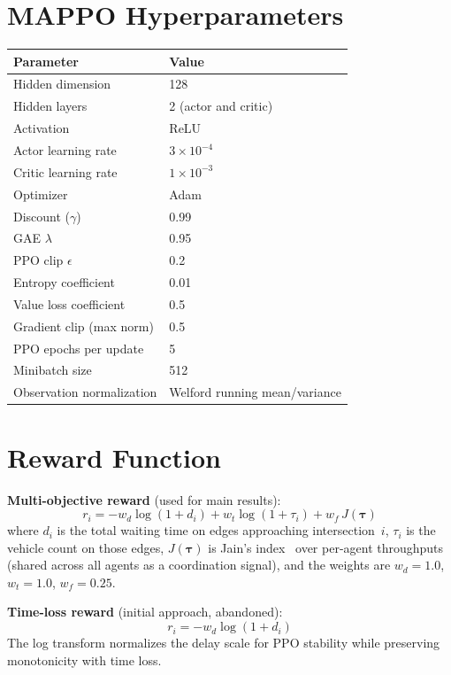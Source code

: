 \section{MAPPO Hyperparameters}
\label{app:hyperparams}

\begin{tabular}{@{}ll@{}}
\toprule
\textbf{Parameter} & \textbf{Value} \\
\midrule
Hidden dimension          & 128 \\
Hidden layers             & 2 (actor and critic) \\
Activation                & ReLU \\
Actor learning rate       & $3 \times 10^{-4}$ \\
Critic learning rate      & $1 \times 10^{-3}$ \\
Optimizer                 & Adam \\
Discount ($\gamma$)       & 0.99 \\
GAE $\lambda$             & 0.95 \\
PPO clip $\epsilon$       & 0.2 \\
Entropy coefficient       & 0.01 \\
Value loss coefficient    & 0.5 \\
Gradient clip (max norm)  & 0.5 \\
PPO epochs per update     & 5 \\
Minibatch size            & 512 \\
Observation normalization & Welford running mean/variance \\
\bottomrule
\end{tabular}

\section{Reward Function}
\label{app:reward}

\textbf{Multi-objective reward} (used for main results):
\begin{equation}
r_i = -w_d \log(1 + d_i) + w_t \log(1 + \tau_i) + w_f \, J(\boldsymbol{\tau})
\label{eq:reward}
\end{equation}
where $d_i$ is the total waiting time on edges approaching intersection~$i$,
$\tau_i$ is the vehicle count on those edges,
$J(\boldsymbol{\tau})$ is Jain's index~\cite{jain1984} over per-agent
throughputs (shared across all agents as a coordination signal), and the
weights are $w_d = 1.0$, $w_t = 1.0$, $w_f = 0.25$.

\textbf{Time-loss reward} (initial approach, abandoned):
\begin{equation}
r_i = -w_d \log(1 + d_i)
\end{equation}
The log transform normalizes the delay scale for PPO stability while
preserving monotonicity with time loss.


